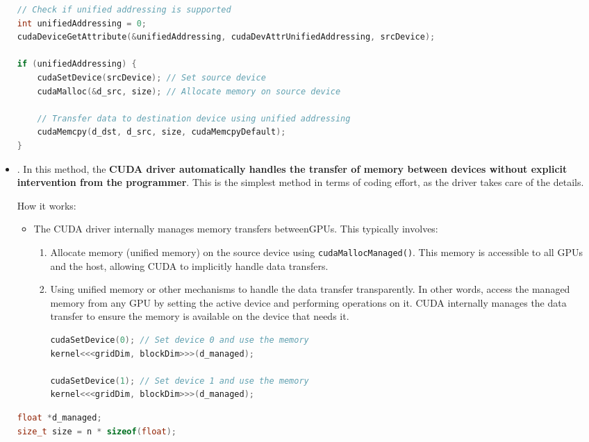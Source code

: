 \begin{itemize}
\begin{examplebox}
\begin{lstlisting}[language=C++]
// Check if unified addressing is supported
int unifiedAddressing = 0;
cudaDeviceGetAttribute(&unifiedAddressing, cudaDevAttrUnifiedAddressing, srcDevice);

if (unifiedAddressing) {
    cudaSetDevice(srcDevice); // Set source device
    cudaMalloc(&d_src, size); // Allocate memory on source device

    // Transfer data to destination device using unified addressing
    cudaMemcpy(d_dst, d_src, size, cudaMemcpyDefault);
}\end{lstlisting}
  \end{examplebox}

  \newpage

  \item {}. In this method, the \textbf{CUDA driver automatically handles the transfer of memory between devices without explicit intervention from the programmer}. This is the simplest method in terms of coding effort, as the driver takes care of the details.

  How it works:
  \begin{itemize}
    \item The CUDA driver internally manages memory transfers between\break GPUs. This typically involves:
    \begin{enumerate}
      \item Allocate memory (unified memory) on the source device using \texttt{cudaMallocManaged()}. This memory is accessible to all GPUs and the host, allowing CUDA to implicitly handle data transfers.
      \item Using unified memory or other mechanisms to handle the data transfer transparently. In other words, access the managed memory from any GPU by setting the active device and performing operations on it. CUDA internally manages the data transfer to ensure the memory is available on the device that needs it.
      \begin{lstlisting}[language=C++]
cudaSetDevice(0); // Set device 0 and use the memory
kernel<<<gridDim, blockDim>>>(d_managed);

cudaSetDevice(1); // Set device 1 and use the memory
kernel<<<gridDim, blockDim>>>(d_managed);\end{lstlisting}
    \end{enumerate}
  \end{itemize}
  \begin{examplebox}
    \begin{lstlisting}[language=C++]
float *d_managed;
size_t size = n * sizeof(float);


\end{lstlisting}
\end{examplebox}
\end{itemize}
